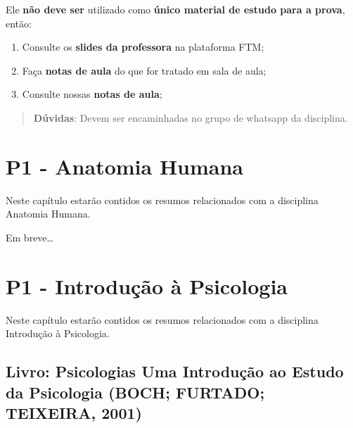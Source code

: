 \documentclass[
]{book}
\providecommand{\tightlist}{%
  \setlength{\itemsep}{0pt}\setlength{\parskip}{0pt}}
\begin{document}
Ele \textbf{não deve ser} utilizado como \textbf{único material de
estudo para a prova}, então:

\begin{enumerate}
\def\labelenumi{\arabic{enumi}.}
\tightlist
\item
  Consulte os \textbf{slides da professora} na plataforma FTM;\\
\item
  Faça \textbf{notas de aula} do que for tratado em sala de aula;\\
\item
  Consulte nossas \textbf{notas de aula};
\end{enumerate}

\begin{quote}
\textbf{Dúvidas}: Devem ser encaminhadas no grupo de whatsapp da
disciplina.
\end{quote}

\hypertarget{p1---anatomia-humana}{%
\chapter{P1 - Anatomia Humana}\label{p1---anatomia-humana}}

Neste capítulo estarão contidos os resumos relacionados com a disciplina
Anatomia Humana.

Em breve\ldots{}

\hypertarget{p1---introduuxe7uxe3o-uxe0-psicologia}{%
\chapter{P1 - Introdução à
Psicologia}\label{p1---introduuxe7uxe3o-uxe0-psicologia}}

Neste capítulo estarão contidos os resumos relacionados com a disciplina
Introdução à Psicologia.

\hypertarget{livro-psicologias-uma-introduuxe7uxe3o-ao-estudo-da-psicologia-boch-furtado-teixeira-2001}{%
\section{\texorpdfstring{Livro: \textbf{Psicologias Uma Introdução ao
Estudo da Psicologia} (BOCH; FURTADO; TEIXEIRA,
2001)}{Livro: Psicologias Uma Introdução ao Estudo da Psicologia (BOCH; FURTADO; TEIXEIRA, 2001)}}\label{livro-psicologias-uma-introduuxe7uxe3o-ao-estudo-da-psicologia-boch-furtado-teixeira-2001}}
\end{document}
